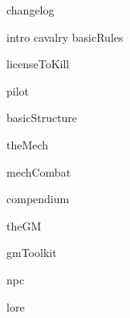 \documentclass[11pt]{report}
\begin{document}
{changelog}
\newpage

\setcounter{secnumdepth}{-2}
\setcounter{tocdepth}{7}

\tableofcontents
\newpage


{intro}
{cavalry}
{basicRules}

{licenseToKill}
\newpage

{pilot}
\newpage

{basicStructure}
\newpage


{theMech}
\newpage

{mechCombat}
\newpage


{compendium}
\newpage

{theGM}
\newpage


{gmToolkit}
\newpage


{npc}
\newpage


{lore}
\newpage
\end{document}
